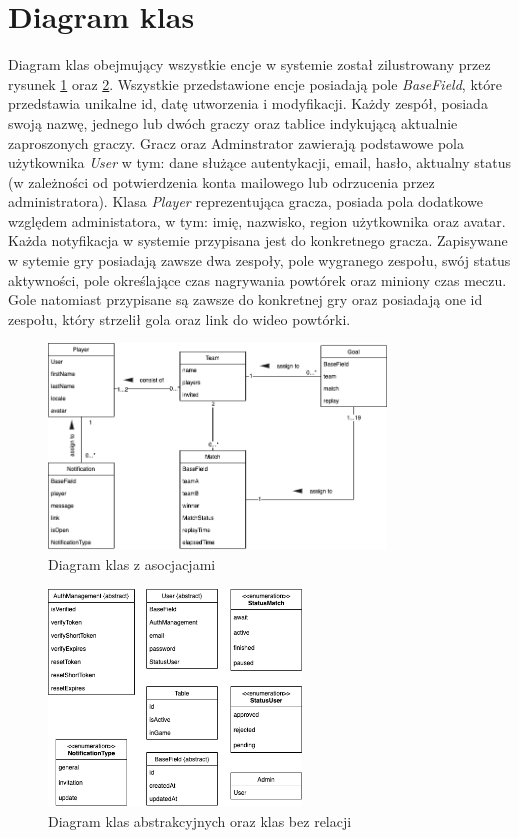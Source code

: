 \section{Diagram klas}
Diagram klas obejmujący wszystkie encje w systemie został zilustrowany przez rysunek \ref{fig:ClassDiagram} oraz \ref{fig:AbstractClassDiagram}. Wszystkie przedstawione encje posiadają pole \textit{BaseField}, które przedstawia unikalne id, datę utworzenia i modyfikacji. Każdy zespół, posiada swoją nazwę, jednego lub dwóch graczy oraz tablice indykującą aktualnie zaproszonych graczy. Gracz oraz Adminstrator zawierają podstawowe pola użytkownika \textit{User} w tym: dane służące autentykacji, email, hasło, aktualny status (w zależności od potwierdzenia konta mailowego lub odrzucenia przez administratora). Klasa \textit{Player} reprezentująca gracza, posiada pola dodatkowe względem administatora, w tym: imię, nazwisko, region użytkownika oraz avatar. Każda notyfikacja w systemie przypisana jest do konkretnego gracza. Zapisywane w sytemie gry posiadają zawsze dwa zespoły, pole wygranego zespołu, swój status aktywności, pole określające czas nagrywania powtórek oraz miniony czas meczu. Gole natomiast przypisane są zawsze do konkretnej gry oraz posiadają one id zespołu, który strzelił gola oraz link do wideo powtórki.

\begin{figure}[h!]
    \centering
    \includegraphics[width=0.8\textwidth]{images/diagrams/class_diagram.png}
    \caption{Diagram klas z asocjacjami}
    \label{fig:ClassDiagram}
\end{figure}

\begin{figure}[h!]
    \centering
    \includegraphics[width=0.6\textwidth]{images/diagrams/class_diagram_rest.png}
    \caption{Diagram klas abstrakcyjnych oraz klas bez relacji}
    \label{fig:AbstractClassDiagram}
\end{figure}

